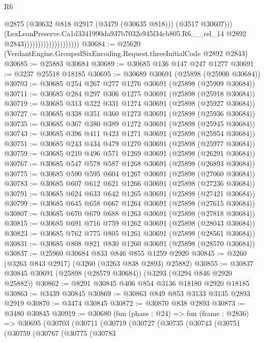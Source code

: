 \begin{lexlean}{R6}
\begin{coremodule}
                                              @2875
                                              (@30632 @818 @2917 (@3479 (@30635 @818)))
                                              (@3517 @30607)))
                                          (LexLeanPreserve.Ca1d3341990da937b7032e945f34cb805.R6.__rel_14
                                            @2892
                                            @2843))))))))))))))))))))
@30684 := @25620 (VerdantEngine.GroupedSixEncoding.Request.threeInitialCode @2892 @2843)
@30685 := @25883 @30684
@30689 := @30685 @136 @147 @247 @1277
@30691 := @3237 @25518 @18185
@30695 := @30689 @30691 (@25898 (@25900 @30684))
@30703 := @30685 @254 @267 @277 @1276 @30691 (@25898 (@25909 @30684))
@30711 := @30685 @284 @297 @306 @1275 @30691 (@25898 (@25918 @30684))
@30719 := @30685 @313 @322 @331 @1274 @30691 (@25898 (@25927 @30684))
@30727 := @30685 @338 @351 @360 @1273 @30691 (@25898 (@25936 @30684))
@30735 := @30685 @367 @380 @389 @1272 @30691 (@25898 (@25945 @30684))
@30743 := @30685 @396 @411 @423 @1271 @30691 (@25898 (@25954 @30684))
@30751 := @30685 @243 @434 @479 @1270 @30691 (@25898 (@25977 @30684))
@30759 := @30685 @210 @496 @571 @1269 @30691 (@25898 (@26291 @30684))
@30767 := @30685 @547 @578 @587 @1268 @30691 (@25898 (@26893 @30684))
@30775 := @30685 @590 @595 @604 @1267 @30691 (@25898 (@27060 @30684))
@30783 := @30685 @607 @612 @621 @1266 @30691 (@25898 (@27236 @30684))
@30791 := @30685 @624 @633 @642 @1265 @30691 (@25898 (@27421 @30684))
@30799 := @30685 @645 @658 @667 @1264 @30691 (@25898 (@27615 @30684))
@30807 := @30685 @670 @679 @688 @1263 @30691 (@25898 (@27818 @30684))
@30815 := @30685 @691 @716 @759 @1262 @30691 (@25898 (@28043 @30684))
@30823 := @30685 @762 @775 @805 @1261 @30691 (@25898 (@28561 @30684))
@30831 := @30685 @808 @821 @830 @1260 @30691 (@25898 (@28570 @30684))
@30837 := @25960 @30684 @833 @846 @855 @1259 @2920
@30845 := @3260 (@3263 @843 @2917) (@3260 (@3263 @838 @2893) @25882)
@30855 := @30837 @30845 @30691 (@25898 (@28579 @30684)) (@3293 (@3294 @846 @2920 @25882))
@30862 := @8291 @30845 @406 @854 @3136 @18180 @2920 @18185
@30863 := @3439 @30845
@30869 := @30863 @849 @853 @3133 @3135 @2893 @2919
@30870 := @3474 @30845
@30872 := @30870 @838 @2893
@30873 := @3480 @30845
@30919 := @30680
    (fun (phase : @24) =>
    fun (frame : @2836) =>
    @30695
      (@30703
        (@30711
          (@30719
            (@30727
              (@30735
                (@30743
                  (@30751
                    (@30759
                      (@30767
                        (@30775
                          (@30783

\end{coremodule}
\end{lexlean}

